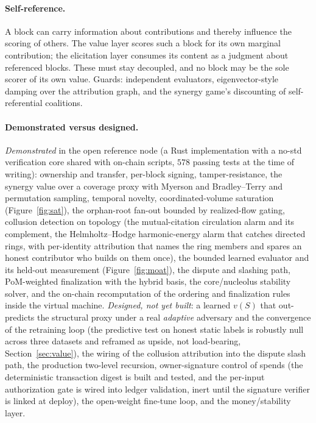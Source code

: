 \documentclass[10pt]{article}
\begin{document}
\paragraph{Self-reference.} A block can carry information about contributions and thereby influence the
scoring of others. The value layer scores such a block for its own marginal contribution; the
elicitation layer consumes its content as a judgment about referenced blocks. These must stay
decoupled, and no block may be the sole scorer of its own value. Guards: independent evaluators,
eigenvector-style damping over the attribution graph, and the synergy game's discounting of
self-referential coalitions.

\paragraph{Demonstrated versus designed.} \emph{Demonstrated} in the open reference node (a Rust
implementation with a no-std verification core shared with on-chain scripts, $578$ passing tests at
the time of writing): ownership and transfer, per-block signing, tamper-resistance, the synergy value
over a coverage proxy with Myerson and Bradley--Terry and permutation sampling, temporal novelty,
coordinated-volume saturation (Figure~\ref{fig:sat}), the orphan-root fan-out bounded by realized-flow
gating, collusion detection on topology (the mutual-citation circulation alarm and its complement, the
Helmholtz--Hodge harmonic-energy alarm that catches directed rings, with per-identity attribution that
names the ring members and spares an honest contributor who builds on them once), the bounded learned
evaluator and its held-out measurement (Figure~\ref{fig:moat}), the dispute and slashing path,
PoM-weighted finalization with the hybrid basis, the core/nucleolus stability solver, and the on-chain
recomputation of the ordering and finalization rules inside the virtual machine. \emph{Designed, not yet
built}: a learned $v(S)$ that out-predicts the structural proxy under a real \emph{adaptive} adversary
and the convergence of the retraining loop (the predictive test on honest static labels is robustly null
across three datasets and reframed as upside, not load-bearing, Section~\ref{sec:value}), the wiring of
the collusion attribution into the dispute slash path, the production two-level recursion, owner-signature control of spends (the
deterministic transaction digest is built and tested, and the per-input authorization gate is wired
into ledger validation, inert until the signature verifier is linked at deploy), the open-weight
fine-tune loop, and the money/stability layer.
\end{document}
